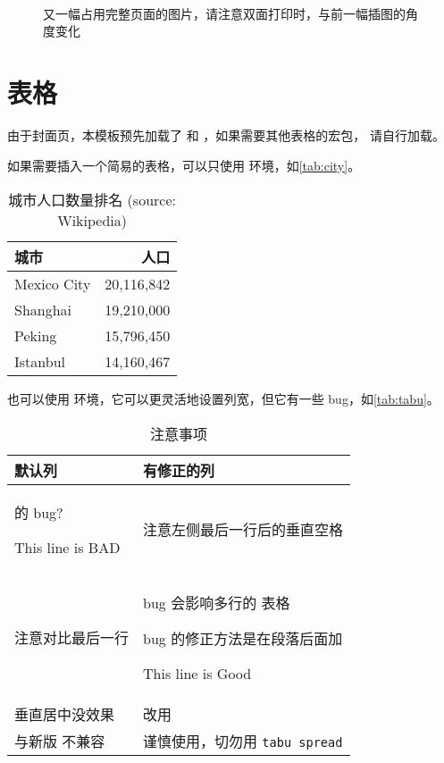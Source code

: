 \setcounter{subfigure}{0}
\begin{sidewaysfigure}
   \\
  \caption[又一幅占用完整页面的图片]{又一幅占用完整页面的图片，请注意双面打印时，与前一幅插图的角度变化}
  \label{fig:fullpage2}
\end{sidewaysfigure}

\section{表格}

由于封面页，本模板预先加载了  和 ，如果需要其他表格的宏包，
请自行加载。

如果需要插入一个简易的表格，可以只使用  环境，如\autoref{tab:city}。
\begin{table}[htb]
  \caption[城市人口]{城市人口数量排名 (source: Wikipedia)\label{tab:city}}
  \begin{tabular}{lr}
    \toprule
    城市 & 人口 \\
    \midrule
    Mexico City & 20,116,842\\
    Shanghai & 19,210,000\\
    Peking & 15,796,450\\
    Istanbul & 14,160,467\\
    \bottomrule
  \end{tabular}
\end{table}

也可以使用  环境，它可以更灵活地设置列宽，但它有一些 bug，如\autoref{tab:tabu}。
\begin{table}[htb]
  \caption{ 注意事项 \label{tab:tabu}}
  \begin{tabu} to .9 \toprule
    默认列 & 有修正的列 \\ \midrule
     的 bug? \par This line is BAD & 注意左侧最后一行后的垂直空格 \\ \midrule
    注意对比最后一行 &
      bug 会影响多行的  表格 \par
      bug 的修正方法是在段落后面加  \par
      This line is Good \\ \midrule
    垂直居中没效果 & 改用  \\ \midrule
    与新版  不兼容 & 谨慎使用，切勿用 \texttt{tabu spread} \\ \bottomrule
  \end{tabu}
\end{table}

